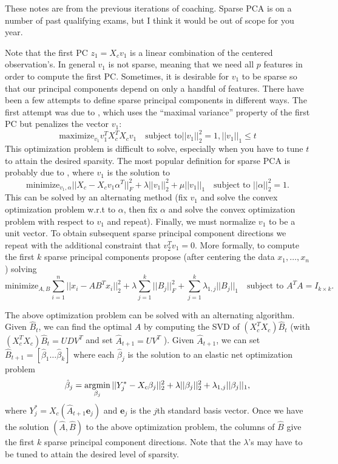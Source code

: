 These notes are from the previous iterations of coaching. Sparse PCA is on a number of past qualifying exams, but I think it would be out of scope for you year.

Note that the first PC $z_1 = X_c v_1$ is a linear combination of the centered observation's. In general $v_1$ is not sparse, meaning that we need all $p$ features in order to compute the first PC. Sometimes, it is desirable for $v_1$ to be sparse so that our principal components depend on only a handful of features. There have been a few attempts to define sparse principal components in different ways. The first attempt was due to \cite{Jolliffe2003}, which uses the “maximal variance” property of the first PC but penalizes the vector $v_1$:
$$\text{maximize}_{v_1} v_1^T X_c^T X_c v_1 \quad \text{subject to} \vert \vert v_1 \vert \vert_2^2 =1, \vert \vert v_1 \vert \vert_1 \leq t $$
This optimization problem is difficult to solve, especially when you have to tune $t$ to attain the desired sparsity. The most popular definition for sparse
PCA is probably due to \cite{Zou2006SparsePCA}, where $v_1$ is the solution to
$$\text{minimize}_{v_1,\alpha} \vert \vert X_c - X_cv_1 \alpha^T \vert \vert_F^2 +\lambda \vert \vert v_1 \vert \vert_2^2+\mu \vert \vert v_1 \vert \vert_1 \quad \text{subject to } \vert \vert \alpha \vert \vert_2^2 =1.$$
This can be solved by an alternating method (fix $v_1$ and solve the convex optimization problem w.r.t to $\alpha$, then fix $\alpha$ and solve the convex optimization problem with respect to $v_1$ and repeat). Finally, we must normalize $v_1$ to be a unit vector. To obtain subsequent sparse principal component directions we repeat with the additional constraint that $v_2^T v_1=0$.  More formally, to compute the first $k$ sparse principal components  \cite{Zou2006SparsePCA} propose (after centering the data $x_1,\dots, x_n$) solving $$\text{minimize}_{A,B}  \sum_{i=1}^n \vert \vert x_i - AB^T x_i \vert \vert_2^2 + \lambda \sum_{j=1}^k  \vert \vert B_j \vert \vert_F^2+\sum_{j=1}^k \lambda_{1,j} \vert \vert B_j \vert \vert_1 \quad \text{subject to } A^T A =I_{k \times k}.$$

The above optimization problem can be solved with an alternating algorithm. Given $\hat{B}_t$, we can find the optimal $A$ by computing the SVD  of $(X_c^T X_c)\hat{B}_t$ (with $(X_c^T X_c)\hat{B}_t =UDV^T$ and set $\hat{A}_{t+1} =U V^T$ ). Given $\hat{A}_{t+1}$, we can set $\hat{B}_{t+1} = [\hat{\beta}_1 \dots \hat{\beta}_k]$ where each $\hat{\beta}_j$ is the solution to an elastic net optimization problem $$\hat{\beta}_j = \operatorname*{argmin}\limits_{\beta_j} \vert \vert Y_j^* - X_c \beta_j \vert \vert_2^2 + \lambda \vert \vert \beta_j \vert \vert_2^2 + \lambda_{1,j} \vert \vert \beta_j \vert \vert_1,$$ where $Y_j^* =X_c (\hat{A}_{t+1} \bm{e}_j)$ and $\bm{e}_j$ is the $j$th standard basis vector. Once we have the solution $(\hat{A},\hat{B})$ to the above optimization problem, the columns of $\hat{B}$ give the first $k$ sparse principal component directions. Note that the $\lambda$'s may have to be tuned to attain the desired level of sparsity. 



